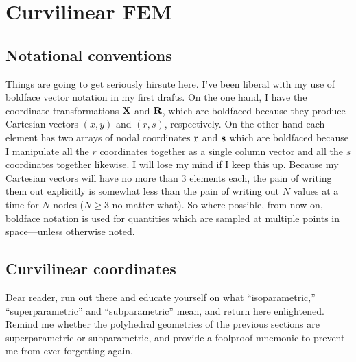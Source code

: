 \chapter{Curvilinear FEM}
\label{chap:curvilinear_fem}

\section{Notational conventions}

Things are going to get seriously hirsute here.  I've been liberal with my use of boldface vector notation in my first drafts.  On the one hand, I have the coordinate transformations $\textbf{X}$ and $\textbf{R}$, which are boldfaced because they produce Cartesian vectors $(x,y)$ and $(r,s)$, respectively.  On the other hand each element has two arrays of nodal coordinates $\textbf{r}$ and $\textbf{s}$ which are boldfaced because I manipulate all the $r$ coordinates together as a single column vector and all the $s$ coordinates together likewise.  I will lose my mind if I keep this up.  Because my Cartesian vectors will have no more than 3 elements each, the pain of writing them out explicitly is somewhat less than the pain of writing out $N$ values at a time for $N$ nodes ($N \ge 3$ no matter what).  So where possible, from now on, boldface notation is used for quantities which are sampled at multiple points in space---unless otherwise noted.

\section{Curvilinear coordinates}

Dear reader, run out there and educate yourself on what ``isoparametric,'' ``superparametric'' and ``subparametric'' mean, and return here enlightened.  Remind me whether the polyhedral geometries of the previous sections are superparametric or subparametric, and provide a foolproof mnemonic to prevent me from ever forgetting again.

